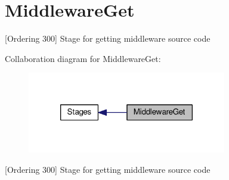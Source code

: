 \hypertarget{group__MiddlewareGet}{\section{Middleware\-Get}
\label{group__MiddlewareGet}
}


\mbox{[}Ordering 300\mbox{]} Stage for getting middleware source code  


Collaboration diagram for Middleware\-Get\-:
\nopagebreak
\begin{figure}[H]
\begin{center}
\leavevmode
\includegraphics[width=246pt]{group__MiddlewareGet}
\end{center}
\end{figure}
\mbox{[}Ordering 300\mbox{]} Stage for getting middleware source code 